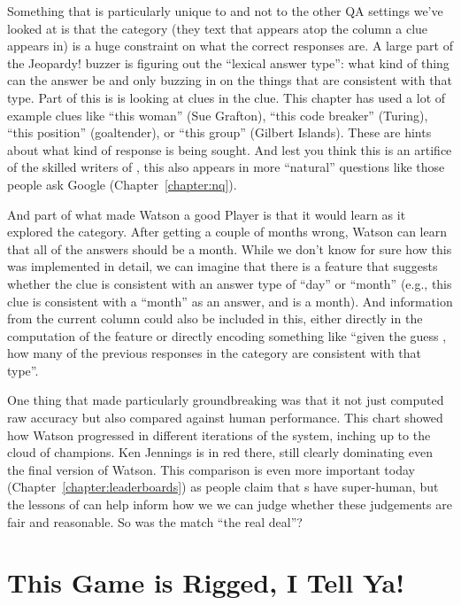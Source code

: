Something that is particularly unique to \jeopardy{} and not to the
other QA settings we’ve looked at is that the category (they text that appears
atop the column a clue appears in) is a huge
constraint on what the correct responses are.
%
A large part of the
Jeopardy! buzzer is figuring out the ``lexical answer type'': what kind of
thing can the answer be and only buzzing in on the things that are consistent
with that type.
%
Part of
this is is looking at clues in the clue.
%
This chapter has used a lot of example clues like ``this woman'' (Sue
Grafton), ``this code breaker'' (Turing), ``this position'' (goaltender), or
``this group'' (Gilbert Islands).
%
These are hints about what kind of response is being sought.
%
And lest you think this is an artifice of the skilled writers of \jeopardy{},
this also appears in more ``natural'' questions like those people ask Google
(Chapter~\ref{chapter:nq}).

And part of what made Watson a good \jeopardy{} Player is that it would learn
as it explored the category.
%
After getting a couple of months wrong, Watson
can learn that all of the answers should be a month.
%
While we don't know for sure how this was implemented in detail, we can
imagine that there is a feature that suggests whether the clue is consistent
with an answer type of ``day'' or ``month'' (e.g., this clue is consistent
with a ``month'' as an answer, and  is a month).
%
And information from the current column could also be included in this, either
directly in the computation of the feature or directly encoding something like
``given the guess , how many of the previous responses in the
category are consistent with that type''.

One thing that made \watson{} particularly groundbreaking was that it not just
computed raw accuracy but also compared against human performance.
%
This chart showed how Watson progressed in different iterations of the system,
inching up to the cloud of \jeopardy{} champions.  Ken Jennings is in red there,
still clearly dominating even the final version of Watson.
%
This comparison is even more important today (Chapter~\ref{chapter:leaderboards}) as people claim that s
have super-human, but the lessons of \watson{} can
help inform how we we can judge whether these judgements are fair and
reasonable.
%
So was the \watson{} match ``the real deal''?

\section{This Game is Rigged, I Tell Ya!}

